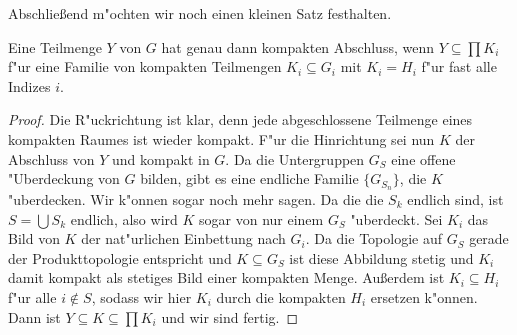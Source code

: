		Abschließend m"ochten wir noch einen kleinen Satz festhalten.
		\begin{satz}%
			Eine Teilmenge $Y$ von $G$ hat genau dann kompakten Abschluss, wenn $Y \subseteq \prod{K_i}$ f"ur eine Familie von kompakten Teilmengen $K_i \subseteq G_i$ mit $K_i = H_i$ f"ur fast alle Indizes $i$.
		\end{satz}
		\begin{proof}
			Die R"uckrichtung ist klar, denn jede abgeschlossene Teilmenge eines kompakten Raumes ist wieder kompakt. 
			F"ur die Hinrichtung sei nun $K$ der Abschluss von $Y$ und kompakt in $G$. 
			Da die Untergruppen $G_S$ eine offene "Uberdeckung von $G$ bilden, gibt es eine endliche Familie $\{G_{S_n}\}$, die $K$ "uberdecken. 
			Wir k"onnen sogar noch mehr sagen. Da die die $S_k$ endlich sind, ist $S = \bigcup S_k$ endlich, also wird $K$ sogar von nur einem $G_S$ "uberdeckt. 
			Sei $K_i$ das Bild von $K$ der nat"urlichen Einbettung nach $G_i$. 
			Da die Topologie auf $G_S$ gerade der Produkttopologie entspricht und $K\subseteq G_S$ ist diese Abbildung stetig und $K_i$ damit kompakt als stetiges Bild einer kompakten Menge. Außerdem ist $K_i \subseteq H_i$ f"ur alle $i\notin S$, sodass wir hier $K_i$ durch die kompakten $H_i$ ersetzen k"onnen. Dann ist $Y\subseteq K \subseteq \prod{K_i}$ und wir sind fertig.
		\end{proof}
